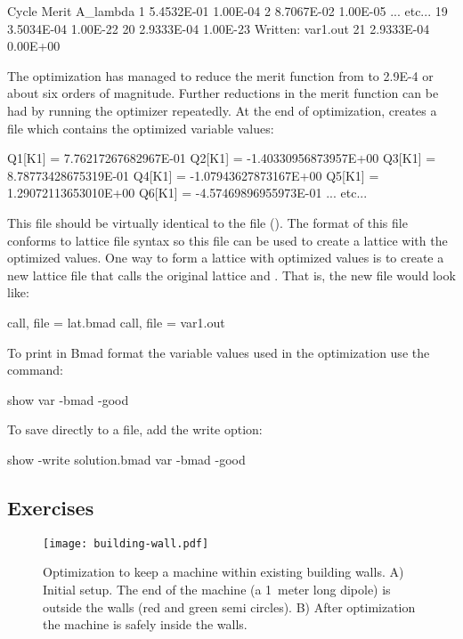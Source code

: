 \documentclass{hitec}     %
\begin{document}
{\begin{code}
  Cycle      Merit   A_lambda
    1    5.4532E-01  1.00E-04
    2    8.7067E-02  1.00E-05
... etc...
   19    3.5034E-04  1.00E-22
   20    2.9333E-04  1.00E-23
Written: var1.out
   21    2.9333E-04  0.00E+00
\end{code}
The optimization has managed to reduce the merit function from to 2.9E-4 or about six orders of
magnitude. Further reductions in the merit function can be had by running the optimizer
repeatedly. At the end of optimization, \tao creates a file  which contains the
optimized variable values:
\begin{code}
 Q1[K1] =   7.76217267682967E-01
 Q2[K1] =  -1.40330956873957E+00
 Q3[K1] =   8.78773428675319E-01
 Q4[K1] =  -1.07943627873167E+00
 Q5[K1] =   1.29072113653010E+00
 Q6[K1] =  -4.57469896955973E-01
... etc...
\end{code}
This file should be virtually identical to the  file (). The
format of this file conforms to \bmad lattice file syntax so this file can be used to create a
lattice with the optimized values. One way to form a lattice with optimized values is to create a
new lattice file that calls the original lattice and . That is, the new file would look
like:
\begin{code}
call, file = lat.bmad
call, file = var1.out
\end{code}

To print in Bmad format the variable values used in the optimization use the command:
\begin{code}
show var -bmad -good
\end{code}
To save directly to a file, add the write option:
\begin{code}
show -write solution.bmad var -bmad -good
\end{code}

\newpage

\subsection{Exercises}
\label{s:opt.ex}

\begin{figure}[tb]
  \centering
  \texttt{[image: building-wall.pdf]}
  \caption{
Optimization to keep a machine within existing building walls. A) Initial setup. The end of the machine (a
1~meter long dipole) is outside the walls (red and green semi circles). B) After optimization the machine is
safely inside the walls.}
  \label{f:b.wall}
\end{figure}

}
\end{document}
